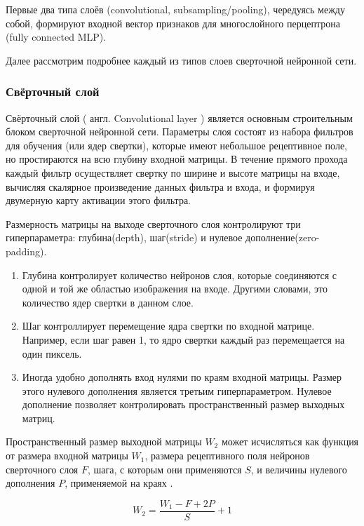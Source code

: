 \documentclass[14pt]{article}
\numberwithin{figure}{section}
\numberwithin{equation}{section}
\begin{document}
Первые два типа слоёв (convolutional, subsampling/pooling), чередуясь между собой, формируют входной вектор признаков для многослойного перцептрона (fully connected MLP).

Далее рассмотрим подробнее каждый из типов слоев сверточной нейронной сети.

\subsubsection{Свёрточный слой}

Свёрточный слой ( англ. Convolutional layer ) является основным строительным блоком сверточной нейронной сети. Параметры слоя состоят из набора фильтров для обучения (или ядер свертки), которые имеют небольшое рецептивное поле, но простираются на всю глубину входной матрицы. В течение прямого прохода каждый фильтр осуществляет свертку по ширине и высоте матрицы на входе, вычисляя скалярное произведение данных фильтра и входа, и формируя двумерную карту активации этого фильтра.

Размерность матрицы на выходе сверточного слоя контролируют три гиперпараметра: глубина(depth), шаг(stride) и нулевое дополнение(zero-padding).

\begin{enumerate}
	\item
	Глубина контролирует количество нейронов слоя, которые соединяются с одной и той же областью изображения на входе. Другими словами, это количество ядер свертки в данном слое.
	\item
	Шаг контроллирует перемещение ядра свертки по входной матрице. Например, если шаг равен 1, то ядро свертки каждый раз перемещается на один пиксель.
	\item
	Иногда удобно дополнять вход нулями по краям входной матрицы. Размер этого нулевого дополнения является третьим гиперпараметром. Нулевое дополнение позволяет контролировать пространственный размер выходных матриц.
\end{enumerate}

Пространственный размер выходной матрицы $W_2$ может исчисляться как функция от размера входной матрицы $W_1$, размера рецептивного поля нейронов сверточного слоя $F$, шага, с которым они применяются $S$, и величины нулевого дополнения $P$, применяемой на краях \cite{Stanford}.

\begin{equation}
	W_2 = \frac{W_1 - F + 2P}{S} + 1
\end{equation}
\end{document}
